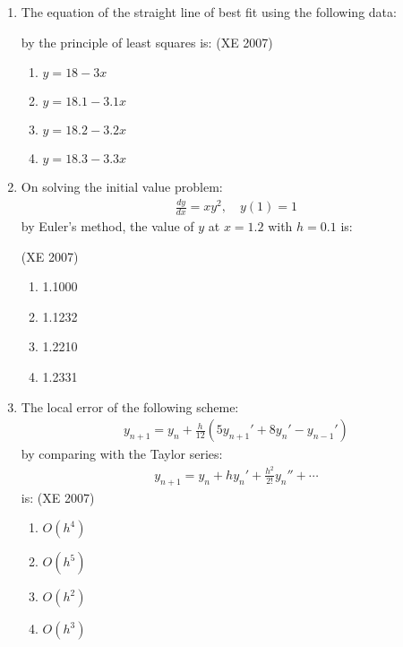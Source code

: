 \documentclass[journal,12pt,onecolumn]{IEEEtran}
\theoremstyle{remark}
\begin{document}
\begin{enumerate}
    \item The equation of the straight line of best fit using the following data:
    \begin{table}[h!]    
    \centering
    
    \end{table}
    by the principle of least squares is:
 \hfill{(XE 2007)}
 \begin{multicols}{4}
    \begin{enumerate}
        \item $y = 18 - 3x$
        \item $y = 18.1 - 3.1x$
        \item $y = 18.2 - 3.2x$
        \item $y = 18.3 - 3.3x$
    \end{enumerate}
    \end{multicols}
    \item On solving the initial value problem:
    \begin{align}
    \frac{dy}{dx} = xy^2, \quad y(1) = 1
    \end{align}    
    by Euler's method, the value of $y$ at $x = 1.2$ with $h = 0.1$ is:
  
 \hfill{(XE 2007)}
    \begin{multicols}{4}
    \begin{enumerate}
        \item 1.1000
        \item 1.1232
        \item 1.2210
        \item 1.2331    
    \end{enumerate}
   \end{multicols}
    \item The local error of the following scheme:
   \begin{align}
    y_{n+1} = y_n + \frac{h}{12} \left( 5y_{n+1}' + 8y_n' - y_{n-1}' \right)
    \end{align}   
    by comparing with the Taylor series:
    \begin{align}
    y_{n+1} = y_n + hy_n' + \frac{h^2}{2!} y_n'' + \cdots
    \end{align}
    is:
 \hfill{(XE 2007)}
    \begin{multicols}{4}
    \begin{enumerate}
        \item $O(h^4)$
        \item $O(h^5)$
        \item $O(h^2)$
        \item $O(h^3)$
    \end{enumerate}
    \end{multicols}


\end{enumerate}
\end{document}
